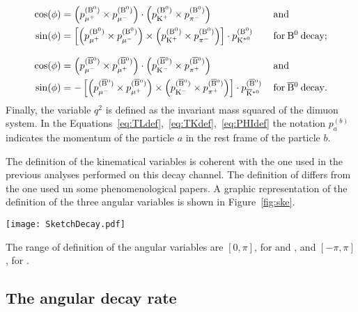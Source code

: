 \begin{equation} \label{eq:PHIdef}
  \begin{aligned}
    \cos(\phi) &= \left( p_{\mu^{+}}^{({\textrm{B}}{}^{0})} \times p_{\mu^{-}}^{({\textrm{B}}{}^{0})} \right) \cdot \left( p_{\textrm{K}^{+}}^{({\textrm{B}}{}^{0})} \times p_{\pi^{-}}^{({\textrm{B}}{}^{0})} \right) \, && \mathrm{and} \\
    \sin(\phi) &= \left[ \left( p_{\mu^{+}}^{({\textrm{B}}{}^{0})} \times p_{\mu^{-}}^{({\textrm{B}}{}^{0})} \right) \times \left( p_{\textrm{K}^{+}}^{({\textrm{B}}{}^{0})} \times p_{\pi^{-}}^{({\textrm{B}}{}^{0})} \right) \right] \cdot p_{\textrm{K}^{\ast0}}^{({\textrm{B}}{}^{0})}\, && \mathrm{for}\:{\textrm{B}}{}^{0}\:\mathrm{decay;} \\[8pt]
    \cos(\phi) &= \left( p_{\mu^{-}}^{(\overline{\textrm{B}}{}^{0})} \times p_{\mu^{+}}^{(\overline{\textrm{B}}{}^{0})} \right) \cdot \left( p_{\textrm{K}^{-}}^{(\overline{\textrm{B}}{}^{0})} \times p_{\pi^{+}}^{(\overline{\textrm{B}}{}^{0})} \right) \, && \mathrm{and} \\
    \sin(\phi) &=-\left[ \left( p_{\mu^{-}}^{(\overline{\textrm{B}}{}^{0})} \times p_{\mu^{+}}^{(\overline{\textrm{B}}{}^{0})} \right) \times \left( p_{\textrm{K}^{-}}^{(\overline{\textrm{B}}{}^{0})} \times p_{\pi^{+}}^{(\overline{\textrm{B}}{}^{0})} \right) \right] \cdot p_{\overline{\textrm{K}}{}^{\ast0}}^{(\overline{\textrm{B}}{}^{0})}\, && \mathrm{for}\:\overline{\textrm{B}}{}^{0}\:\mathrm{decay.} \\
  \end{aligned}
\end{equation}
Finally, the variable $q^2$ is defined as the invariant mass squared of the dimuon system.
In the Equations~\ref{eq:TLdef},~\ref{eq:TKdef},~\ref{eq:PHIdef} the notation $p_a^{(b)}$ indicates the momentum of the particle $a$ in the rest frame of the particle $b$.

The definition of the kinematical variables is coherent with the one used in the previous analyses performed on this decay channel.
The definition of \TL differs from the one used un some phenomenological papers.
A graphic representation of the definition of the three angular variables is shown in Figure~\ref{fig:ske}.

\begin{figure*}[!tbh]
  \begin{center}
    \texttt{[image: SketchDecay.pdf]}
    \caption{Illustration of the angular variables \TL (left), \TK (middle), and \PHI (right) for the decay \BtoKstmumudecay.}
    \label{fig:ske}
  \end{center}
\end{figure*}

The range of definition of the angular variables are $\left[0,\pi\right]$, for \TL and \TK, and $\left[-\pi,\pi\right]$, for \PHI.


\subsection{The angular decay rate}
\label{sec:decRate}

